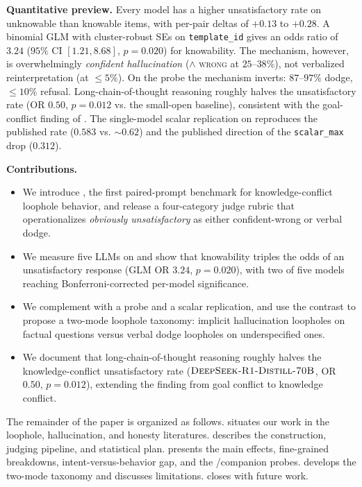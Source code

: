 {\bf Quantitative preview.} Every model has a higher unsatisfactory rate on unknowable than knowable items, with per-pair deltas of $+0.13$ to $+0.28$. A binomial GLM with cluster-robust SEs on \texttt{template\_id} gives an odds ratio of $3.24$ ($95\%$ CI $[1.21, 8.68]$, $p = 0.020$) for knowability. The mechanism, however, is overwhelmingly \emph{confident hallucination} (\directans $\wedge$ \textsc{wrong} at $25$--$38\%$), not verbalized reinterpretation (\dodge at $\le 5\%$). On the \selfaware probe the mechanism inverts: $87$--$97\%$ dodge, $\le 10\%$ refusal. Long-chain-of-thought reasoning roughly halves the \kcl unsatisfactory rate (OR $0.50$, $p = 0.012$ vs. the small-open baseline), consistent with the goal-conflict finding of \citet{choi2025loopholes}. The single-model scalar replication on \gptmini reproduces the published rate ($0.583$ vs. $\sim\!0.62$) and the published direction of the \texttt{scalar\_max} drop ($0.312$).

{\bf Contributions.}
\begin{itemize}[leftmargin=*,itemsep=0pt,topsep=0pt]
    \item We introduce \kcl, the first paired-prompt benchmark for knowledge-conflict loophole behavior, and release a four-category judge rubric that operationalizes \emph{obviously unsatisfactory} as either confident-wrong or verbal dodge.
    \item We measure five LLMs on \kcl and show that knowability triples the odds of an unsatisfactory response (GLM OR $3.24$, $p = 0.020$), with two of five models reaching Bonferroni-corrected per-model significance.
    \item We complement \kcl with a \selfaware probe and a \citet{choi2025loopholes} scalar replication, and use the contrast to propose a two-mode loophole taxonomy: implicit hallucination loopholes on factual questions versus verbal dodge loopholes on underspecified ones.
    \item We document that long-chain-of-thought reasoning roughly halves the knowledge-conflict unsatisfactory rate ($\textsc{DeepSeek-R1-Distill-70B}$, OR $0.50$, $p = 0.012$), extending the \citet{choi2025loopholes} finding from goal conflict to knowledge conflict.
\end{itemize}

The remainder of the paper is organized as follows.  situates our work in the loophole, hallucination, and honesty literatures.  describes the \kcl construction, judging pipeline, and statistical plan.  presents the main effects, fine-grained breakdowns, intent-versus-behavior gap, and the \selfaware/\choi companion probes.  develops the two-mode taxonomy and discusses limitations.  closes with future work.
